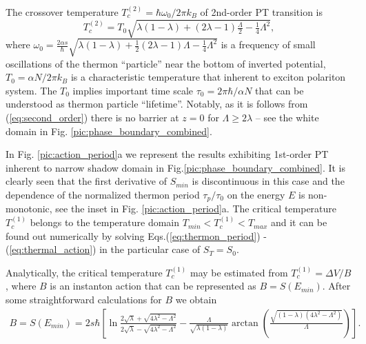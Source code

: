 \documentclass[aps, pre, preprint, groupedaddress, superscriptaddress, showkeys, showpacs] {revtex4-1}
\begin{document}
The crossover temperature $T_{c}^{(2)} = \hbar \omega_0/ 2 \pi k_B$ of 2nd-order PT transition  is 
%
\begin{equation}
T_{c}^{(2)} = T_{0} \sqrt{\lambda (1 - \lambda) + (2 \lambda - 1) \tfrac{\Lambda}{2} - \tfrac{1}{4} \Lambda^2},
\label{eq:second_order}
\end{equation}
%
where  $\omega_0 = \frac{2 \alpha s}{\hbar} \sqrt{\lambda (1 - \lambda) + \tfrac{1}{2} (2 \lambda - 1) \Lambda - \tfrac{1}{4} \Lambda^2}$ is a frequency of small oscillations of the thermon ``particle'' near the bottom of inverted potential,  $T_{0}=\alpha N / 2\pi k_B$ is a characteristic temperature that inherent to exciton polariton system.  The $T_{0}$  implies important time scale $\tau_0=2\pi\hbar/ \alpha N$ that can be understood as thermon particle ``lifetime''. Notably, as it is follows from (\ref{eq:second_order}) there is no barrier at $z = 0$ for $\Lambda \ge 2\lambda$ -- see the white domain in Fig. \ref{pic:phase_boundary_combined}.
 
In Fig. \ref{pic:action_period}a we represent the results exhibiting 1st-order PT inherent to narrow shadow domain in Fig.\ref{pic:phase_boundary_combined}.
It is clearly seen that the first derivative of $S_{min}$ is discontinuous in this case and the dependence of the normalized thermon period  $\tau_p / \tau_0$ on the energy $E$ is non-monotonic, see the inset in Fig. \ref{pic:action_period}a.
The critical temperature $T_{c}^{(1)}$ belongs to the temperature domain $T_{min} < T_{c}^{(1)} < T_{max}$ and it can be found out numerically by solving Eqs.(\ref{eq:thermon_period}) - (\ref{eq:thermal_action}) in the particular case of $S_T = S_0$.
 
Analytically, the critical temperature $T_{c}^{(1)}$ may be estimated from $T_{c}^{(1)} = \Delta V / B$, where $B$ is an instanton action that can be represented as $B = S(E_{min})$.
After some straightforward calculations for $B$ we obtain
%
\begin{equation}
\begin{array}{c}
B = S(E_{min}) = 2 s \hbar \left[ \ln \frac{2 \sqrt{\lambda} + \sqrt{4 \lambda^2 - \Lambda^2}}{2 \sqrt{\lambda} - \sqrt{4 \lambda^2 - \Lambda^2}} - \frac{\Lambda}{\sqrt{\lambda (1 - \lambda)}} \arctan \left( \frac{\sqrt{(1 - \lambda) (4 \lambda^2 - \Lambda^2)}}{\Lambda} \right) \right].
\end{array}
\label{eq:B_action}
\end{equation}
%
\end{document}
